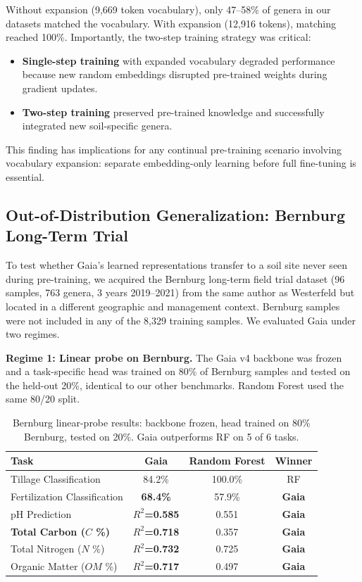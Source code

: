 \documentclass[11pt,a4paper]{article}
\begin{document}
Without expansion (9,669 token vocabulary), only 47--58\% of genera in our datasets matched the vocabulary. With expansion (12,916 tokens), matching reached 100\%. Importantly, the two-step training strategy was critical:

\begin{itemize}[leftmargin=1.5em]
    \item \textbf{Single-step training} with expanded vocabulary degraded performance because new random embeddings disrupted pre-trained weights during gradient updates.
    \item \textbf{Two-step training} preserved pre-trained knowledge and successfully integrated new soil-specific genera.
\end{itemize}

This finding has implications for any continual pre-training scenario involving vocabulary expansion: separate embedding-only learning before full fine-tuning is essential.

\subsection{Out-of-Distribution Generalization: Bernburg Long-Term Trial}

To test whether Gaia's learned representations transfer to a soil site never seen during pre-training, we acquired the Bernburg long-term field trial dataset (96 samples, 763 genera, 3 years 2019--2021) from the same author as Westerfeld but located in a different geographic and management context. Bernburg samples were not included in any of the 8,329 training samples. We evaluated Gaia under two regimes.

\textbf{Regime 1: Linear probe on Bernburg.} The Gaia v4 backbone was frozen and a task-specific head was trained on 80\% of Bernburg samples and tested on the held-out 20\%, identical to our other benchmarks. Random Forest used the same 80/20 split.

\begin{table}[H]
\centering
\caption{Bernburg linear-probe results: backbone frozen, head trained on 80\% Bernburg, tested on 20\%. Gaia outperforms RF on 5 of 6 tasks.}
\label{tab:bernburg_lp}
\begin{tabular}{lccc}
\toprule
\textbf{Task} & \textbf{Gaia} & \textbf{Random Forest} & \textbf{Winner} \\
\midrule
Tillage Classification & 84.2\% & 100.0\% & RF \\
Fertilization Classification & \textbf{68.4\%} & 57.9\% & \textbf{Gaia} \\
pH Prediction & \textbf{$R^2$=0.585} & 0.551 & \textbf{Gaia} \\
\textbf{Total Carbon ($C$ \%)} & \textbf{$R^2$=0.718} & 0.357 & \textbf{Gaia} \\
Total Nitrogen ($N$ \%) & \textbf{$R^2$=0.732} & 0.725 & \textbf{Gaia} \\
Organic Matter ($OM$ \%) & \textbf{$R^2$=0.717} & 0.497 & \textbf{Gaia} \\
\bottomrule
\end{tabular}
\end{table}
\end{document}
